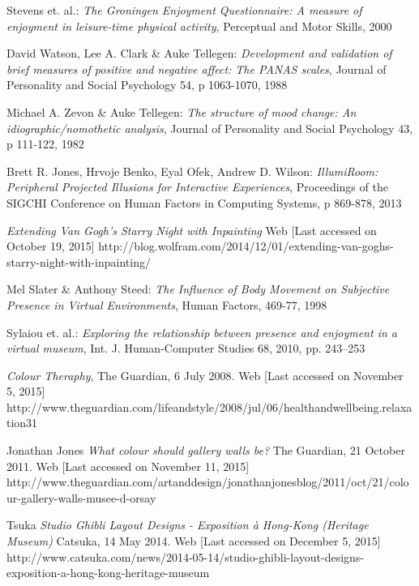 \documentclass[a4paper]{article}
\begin{document}
\begin{thebibliography}{99}
 Stevens et. al.:
\emph{The Groningen Enjoyment Questionnaire: A measure of enjoyment in leisure-time physical activity},
Perceptual and Motor Skills, 2000

 David Watson, Lee A. Clark \& Auke Tellegen:
\emph{Development and validation of brief measures of positive and negative affect: The PANAS scales},
Journal of Personality and Social Psychology 54, p 1063-1070, 1988

 Michael A. Zevon \& Auke Tellegen:
\emph{The structure of mood change: An idiographic/nomothetic analysis},
Journal of Personality and Social Psychology 43, p 111-122, 1982

 Brett R. Jones, Hrvoje Benko, Eyal Ofek, Andrew D. Wilson:
\emph{IllumiRoom: Peripheral Projected Illusions for
Interactive Experiences},
Proceedings of the SIGCHI Conference on Human Factors in Computing Systems, p 869-878, 2013

\emph{Extending Van Gogh’s \emph{Starry Night} with Inpainting}
Web [Last accessed on October 19, 2015]
http://blog.wolfram.com/2014/12/01/extending-van-goghs-starry-night-with-inpainting/

 Mel Slater \& Anthony Steed:
\emph{The Influence of Body Movement on Subjective Presence in Virtual Environments},
Human Factors, 469-77, 1998

 Sylaiou et. al.:
\emph{Exploring the relationship between presence and enjoyment in a virtual museum},
Int. J. Human-Computer Studies 68, 2010, pp. 243--253

\emph{Colour Theraphy}, 
The Guardian, 6 July 2008.
Web [Last accessed on November 5, 2015]
http://www.theguardian.com/lifeandstyle/2008/jul/06/healthandwellbeing.relaxation31

 Jonathan Jones
\emph{What colour should gallery walls be?}
The Guardian, 21 October 2011.
Web [Last accessed on November 11, 2015]
http://www.theguardian.com/artanddesign/jonathanjonesblog/2011/oct/21/colour-gallery-walls-musee-d-orsay

 Tsuka
\emph{Studio Ghibli Layout Designs - Exposition à Hong-Kong (Heritage Museum)}
Catsuka, 14 May 2014.
Web [Last accessed on December 5, 2015] 
http://www.catsuka.com/news/2014-05-14/studio-ghibli-layout-designs-exposition-a-hong-kong-heritage-museum

\end{thebibliography}
\end{document}
